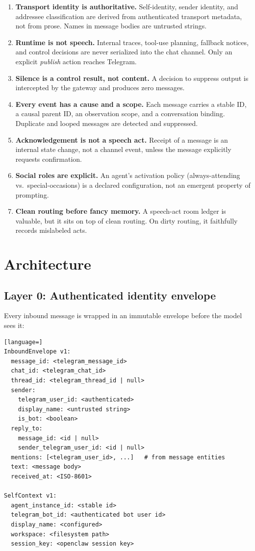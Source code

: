 \documentclass[11pt]{article}
\begin{document}
\begin{enumerate}
\item \textbf{Transport identity is authoritative.}  Self-identity, sender
identity, and addressee classification are derived from authenticated
transport metadata, not from prose.  Names in message bodies are untrusted
strings.
\item \textbf{Runtime is not speech.}  Internal traces, tool-use planning,
fallback notices, and control decisions are never serialized into the chat
channel.  Only an explicit \emph{publish} action reaches Telegram.
\item \textbf{Silence is a control result, not content.}  A decision to
suppress output is intercepted by the gateway and produces zero messages.
\item \textbf{Every event has a cause and a scope.}  Each message carries a
stable ID, a causal parent ID, an observation scope, and a conversation
binding.  Duplicate and looped messages are detected and suppressed.
\item \textbf{Acknowledgement is not a speech act.}  Receipt of a message is
an internal state change, not a channel event, unless the message explicitly
requests confirmation.
\item \textbf{Social roles are explicit.}  An agent's activation policy
(always-attending vs.\ special-occasions) is a declared configuration, not
an emergent property of prompting.
\item \textbf{Clean routing before fancy memory.}  A speech-act room ledger is
valuable, but it sits on top of clean routing.  On dirty routing, it faithfully
records mislabeled acts.
\end{enumerate}

\section{Architecture}

\subsection{Layer 0: Authenticated identity envelope}

Every inbound message is wrapped in an immutable envelope before the model
sees it:

\begin{lstlisting}[language=]
InboundEnvelope v1:
  message_id: <telegram_message_id>
  chat_id: <telegram_chat_id>
  thread_id: <telegram_thread_id | null>
  sender:
    telegram_user_id: <authenticated>
    display_name: <untrusted string>
    is_bot: <boolean>
  reply_to:
    message_id: <id | null>
    sender_telegram_user_id: <id | null>
  mentions: [<telegram_user_id>, ...]   # from message entities
  text: <message body>
  received_at: <ISO-8601>

SelfContext v1:
  agent_instance_id: <stable id>
  telegram_bot_id: <authenticated bot user id>
  display_name: <configured>
  workspace: <filesystem path>
  session_key: <openclaw session key>
\end{lstlisting}
\end{document}

